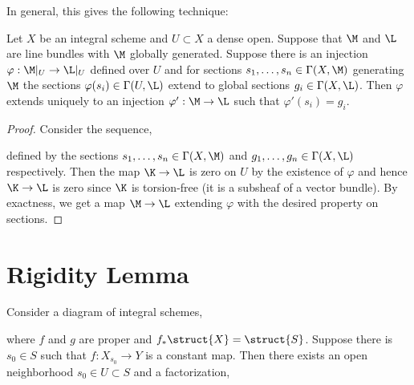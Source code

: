 \documentclass[12pt]{article}
\begin{document}
In general, this gives the following technique:

\begin{lemma}
Let $X$ be an integral scheme and $U \subset X$ a dense open. Suppose that $\M$ and $\L$ are line bundles with $\M$ globally generated. Suppose there is an injection $\varphi : \M|_U \to \L|_U$ defined over $U$ and for sections $s_1, \dots, s_n \in \Gamma(X, \M)$ generating $\M$ the sections $\varphi(s_i) \in \Gamma(U, \L)$ extend to global sections $g_i \in \Gamma(X, \L)$. Then $\varphi$ extends uniquely to an injection $\varphi' : \M \to \L$ such that $\varphi'(s_i) = g_i$.
\end{lemma}

\begin{proof}
Consider the sequence,
\begin{center}
\end{center}
defined by the sections $s_1, \dots, s_n \in \Gamma(X, \M)$ and $g_1, \dots, g_n \in \Gamma(X, \L)$ respectively. Then the map $\K \to \L$ is zero on $U$ by the existence of $\varphi$ and hence $\K \to \L$ is zero since $\K$ is torsion-free (it is a subsheaf of a vector bundle). By exactness, we get a map $\M \to \L$ extending $\varphi$ with the desired property on sections.
\end{proof}

\section{Rigidity Lemma}

\begin{lemma} \label{rigidity}
Consider a diagram of integral schemes,
\begin{center}
\end{center}
where $f$ and $g$ are proper and $f_* \struct{X} = \struct{S}$. Suppose there is $s_0 \in S$ such that $f : X_{s_0} \to Y$ is a constant map. Then there exists an open neighborhood $s_0 \in U \subset S$ and a factorization,
\begin{center}
\end{center}
\end{lemma}
\end{document}
